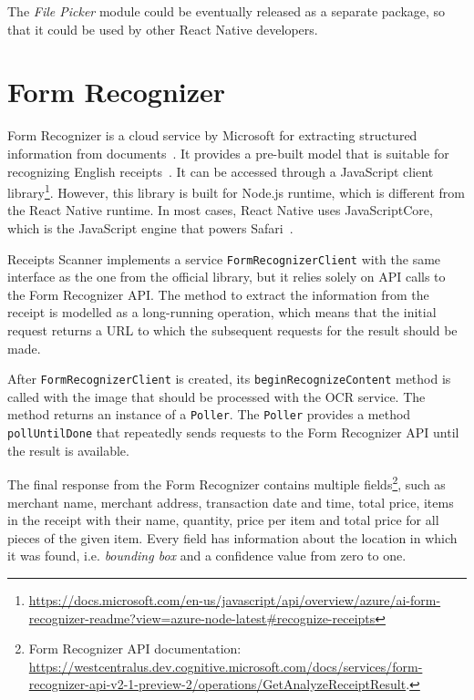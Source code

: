 \documentclass[
  digital, %
  table,   %
  oneside, %
  lof,     %
  lot,     %
]{fithesis3}
\newcommand{\definition}[1]{{#1}}
\begin{document}
The \textit{File Picker} module could be eventually released as a separate package, so that it could be used by other React Native developers.

\section{Form Recognizer}
\label{sec:form_recognizer}
\definition{Form} Recognizer is a cloud service by Microsoft for extracting structured information from documents~\cite{WhatIsFormRecognizer}. It provides a pre-built model that is suitable for recognizing English receipts~\cite{FormRecognizerPrebuiltReceiptModel}. It can be accessed through a JavaScript client library\footnote{\url{https://docs.microsoft.com/en-us/javascript/api/overview/azure/ai-form-recognizer-readme?view=azure-node-latest\#recognize-receipts}}. However, this library is built for Node.js runtime, which is different from the React Native runtime. In most cases, React Native uses JavaScriptCore, which is the JavaScript engine that powers Safari~\cite{JavaScriptRNEnvironment}.

Receipts Scanner implements a service \texttt{FormRecognizerClient} with the same interface as the one from the official library, but it relies solely on API calls to the Form Recognizer API. The method to extract the information from the receipt is modelled as a long-running operation, which means that the initial request returns a URL to which the subsequent requests for the result should be made.

After \texttt{FormRecognizerClient} is created, its \texttt{beginRecognizeContent} method is called with the image that should be processed with the OCR service. The method returns an instance of a \texttt{Poller}. The \texttt{Poller} provides a method \texttt{pollUntilDone} that repeatedly sends requests to the Form Recognizer API until the result is available.

The final response from the Form Recognizer contains multiple fields\footnote{Form Recognizer API documentation:\\\url{https://westcentralus.dev.cognitive.microsoft.com/docs/services/form-recognizer-api-v2-1-preview-2/operations/GetAnalyzeReceiptResult}.}, such as merchant name, merchant address, transaction date and time, total price, items in the receipt with their name, quantity, price per item and total price for all pieces of the given item. Every field has information about the location in which it was found, i.e. \textit{bounding box} and a confidence value from zero to one.
\end{document}
